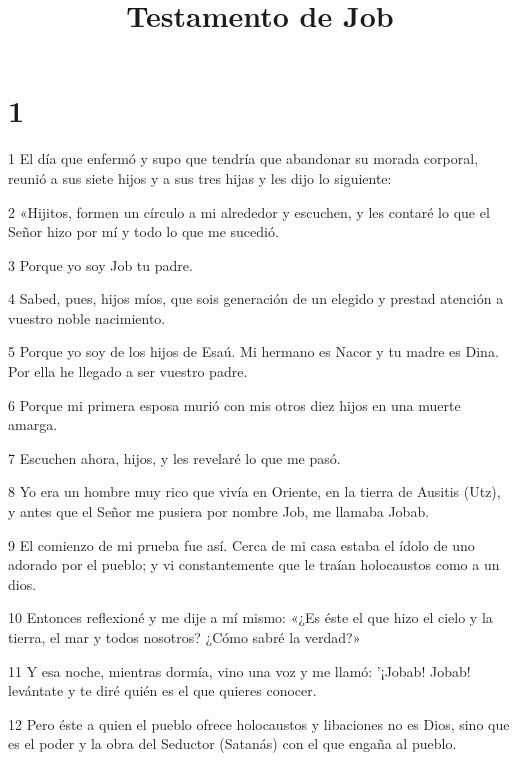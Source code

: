 


\title{Testamento de Job}

\chapter{1}

\par 1 El día que enfermó y supo que tendría que abandonar su morada corporal, reunió a sus siete hijos y a sus tres hijas y les dijo lo siguiente:

\par 2 «Hijitos, formen un círculo a mi alrededor y escuchen, y les contaré lo que el Señor hizo por mí y todo lo que me sucedió.

\par 3 Porque yo soy Job tu padre.

\par 4 Sabed, pues, hijos míos, que sois generación de un elegido y prestad atención a vuestro noble nacimiento.

\par 5 Porque yo soy de los hijos de Esaú. Mi hermano es Nacor y tu madre es Dina. Por ella he llegado a ser vuestro padre.

\par 6 Porque mi primera esposa murió con mis otros diez hijos en una muerte amarga.

\par 7 Escuchen ahora, hijos, y les revelaré lo que me pasó.

\par 8 Yo era un hombre muy rico que vivía en Oriente, en la tierra de Ausitis (Utz), y antes que el Señor me pusiera por nombre Job, me llamaba Jobab.

\par 9 El comienzo de mi prueba fue así. Cerca de mi casa estaba el ídolo de uno adorado por el pueblo; y vi constantemente que le traían holocaustos como a un dios.

\par 10 Entonces reflexioné y me dije a mí mismo: «¿Es éste el que hizo el cielo y la tierra, el mar y todos nosotros? ¿Cómo sabré la verdad?»

\par 11 Y esa noche, mientras dormía, vino una voz y me llamó: '¡Jobab! Jobab! levántate y te diré quién es el que quieres conocer.

\par 12 Pero éste a quien el pueblo ofrece holocaustos y libaciones no es Dios, sino que es el poder y la obra del Seductor (Satanás) con el que engaña al pueblo.

